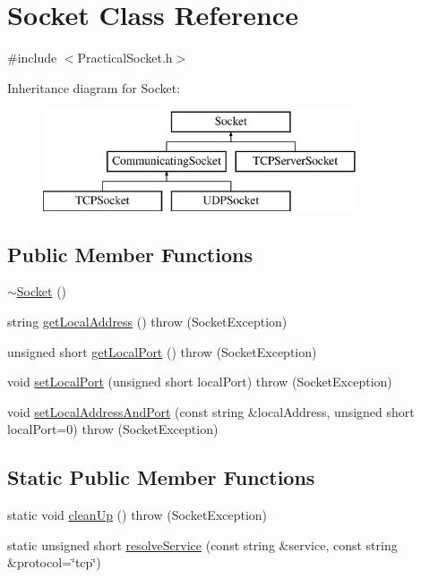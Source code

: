 \hypertarget{classSocket}{\section{Socket Class Reference}
\label{classSocket}
}


{\ttfamily \#include $<$Practical\-Socket.\-h$>$}

Inheritance diagram for Socket\-:\begin{figure}[H]
\begin{center}
\leavevmode
\includegraphics[height=3.000000cm]{classSocket}
\end{center}
\end{figure}
\subsection*{Public Member Functions}
\begin{DoxyCompactItemize}
\item 
\hyperlink{classSocket_aeac4eb6379a543d38ed88977d3b6630a}{$\sim$\-Socket} ()
\item 
string \hyperlink{classSocket_a0fca07bdfa97874fba1a17995ed7cda3}{get\-Local\-Address} ()  throw (\-Socket\-Exception)
\item 
unsigned short \hyperlink{classSocket_ae01143b667d69483a2f53d0f4ce7eeed}{get\-Local\-Port} ()  throw (\-Socket\-Exception)
\item 
void \hyperlink{classSocket_a773fe4a35146002de76952e16fdebcfa}{set\-Local\-Port} (unsigned short local\-Port)  throw (\-Socket\-Exception)
\item 
void \hyperlink{classSocket_aa6b986410bc2e606ba27d01fa7cb8836}{set\-Local\-Address\-And\-Port} (const string \&local\-Address, unsigned short local\-Port=0)  throw (\-Socket\-Exception)
\end{DoxyCompactItemize}
\subsection*{Static Public Member Functions}
\begin{DoxyCompactItemize}
\item 
static void \hyperlink{classSocket_a7ca859fca0e15ae7157b2ab29bb5399c}{clean\-Up} ()  throw (\-Socket\-Exception)
\item 
static unsigned short \hyperlink{classSocket_a19fdcfe174b5a6578f56f396a8c70b6b}{resolve\-Service} (const string \&service, const string \&protocol=\char`\"{}tcp\char`\"{})
\end{DoxyCompactItemize}
